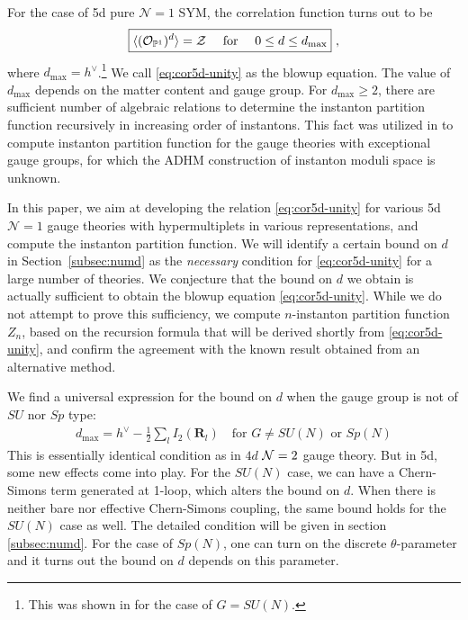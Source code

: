 \documentclass[letterpaper, 11pt]{article}
\def\IP{\mathbb{P}}
\def\CN{{\cal N}}
\def\CZ{{\cal Z}}
\begin{document}
For the case of 5d pure $\mathcal{N}=1$ SYM, the correlation function turns out to be  
\begin{align}
  \label{eq:cor5d-unity}
\boxed{  \langle (\mathcal{O}_{\IP^1})^{d}\rangle = \CZ \quad \text{ for }\quad 0\leq d \leq d_\text{max} } \ , 
\end{align}
where $d_\text{max} = h^\vee$.\footnote{This was shown in \cite{Nakajima:2005fg} for the case of $G=SU(N)$.} We call \eqref{eq:cor5d-unity} as the blowup equation. The value of $d_{\text{max}}$ depends on the matter content and gauge group. For $d_\text{max} \geq 2$, there are sufficient number of algebraic relations to determine the instanton partition function recursively in increasing order of instantons. This fact was utilized in \cite{Keller:2012da} to compute instanton partition function for the gauge theories with exceptional gauge groups, for which the ADHM construction of instanton moduli space is unknown. 

In this paper, we aim at developing the relation \eqref{eq:cor5d-unity} for various 5d 
$\mathcal{N}=1$ gauge theories with hypermultiplets in various representations, and compute the instanton partition function. We will identify a certain bound on $d$ in Section~\ref{subsec:numd} as the \emph{necessary} condition for \eqref{eq:cor5d-unity} for a large number of theories. 
We conjecture that the bound on $d$ we obtain is actually sufficient to obtain the blowup equation \eqref{eq:cor5d-unity}. While we do not attempt to prove this sufficiency, we compute $n$-instanton partition function $Z_n$, based on the recursion formula that will be derived shortly from \eqref{eq:cor5d-unity}, and confirm the agreement with the known result obtained from an alternative method.

We find a universal expression for the bound on $d$ when the gauge group is not of $SU$ nor $Sp$ type:
\begin{align}
  \label{eq:cor5d-dmax}
 d_{\textrm{max}} =  h^\vee -\frac{1}{2}\sum_l I_2(\mathbf{R}_l) \quad \textrm{for } G \neq SU(N) \textrm{ or } Sp(N) 
\end{align}
This is essentially identical condition as in $4d$ $\CN=2$ gauge theory. But in 5d, some new effects come into play. 
For the $SU(N)$ case, we can have a Chern-Simons term generated at 1-loop, which alters the bound on $d$. When there is neither bare nor effective Chern-Simons coupling, the same bound holds for the $SU(N)$ case as well. The detailed condition will be given in section \ref{subsec:numd}. For the case of $Sp(N)$, one can turn on the discrete $\theta$-parameter and it turns out the bound on $d$ depends on this parameter. 
\end{document}
